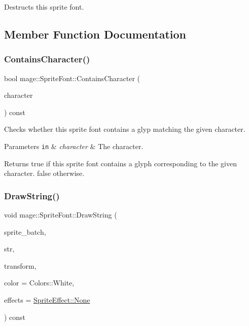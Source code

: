 Destructs this sprite font. 

\subsection{Member Function Documentation}
\hypertarget{classmage_1_1_sprite_font_a01836c4197661dbdd66c624d8dc6a7c3}{}\label{classmage_1_1_sprite_font_a01836c4197661dbdd66c624d8dc6a7c3} 
\subsubsection{\texorpdfstring{Contains\+Character()}{ContainsCharacter()}}
{\footnotesize\ttfamily bool mage\+::\+Sprite\+Font\+::\+Contains\+Character (\begin{DoxyParamCaption}\item[{wchar\+\_\+t}]{character }\end{DoxyParamCaption}) const}

Checks whether this sprite font contains a glyp matching the given character.


\begin{DoxyParams}[1]{Parameters}
\mbox{\tt in}  & {\em character} & The character. \\
\hline
\end{DoxyParams}
\begin{DoxyReturn}{Returns}
{\ttfamily true} if this sprite font contains a glyph corresponding to the given character. {\ttfamily false} otherwise. 
\end{DoxyReturn}
\hypertarget{classmage_1_1_sprite_font_a14b29a1669b3769bd09664b3b1685b43}{}\label{classmage_1_1_sprite_font_a14b29a1669b3769bd09664b3b1685b43} 
\subsubsection{\texorpdfstring{Draw\+String()}{DrawString()}\hspace{0.1cm}{\footnotesize\ttfamily [1/2]}}
{\footnotesize\ttfamily void mage\+::\+Sprite\+Font\+::\+Draw\+String (\begin{DoxyParamCaption}\item[{Sprite\+Batch \&}]{sprite\+\_\+batch,  }\item[{const wchar\+\_\+t $\ast$}]{str,  }\item[{const Sprite\+Transform \&}]{transform,  }\item[{const X\+M\+V\+E\+C\+T\+OR \&}]{color = {\ttfamily Colors\+:\+:White},  }\item[{\hyperlink{namespacemage_a9cfe18123066ba4236f548f9de75d881}{Sprite\+Effect}}]{effects = {\ttfamily \hyperlink{namespacemage_a9cfe18123066ba4236f548f9de75d881a6adf97f83acf6453d4a6a4b1070f3754}{Sprite\+Effect\+::\+None}} }\end{DoxyParamCaption}) const}

